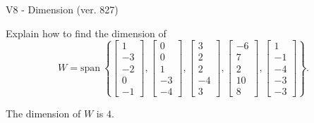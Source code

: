 \begin{exercise}
  \begin{exerciseTitle}V8 - Dimension (ver. 827)\end{exerciseTitle}
  \begin{exerciseStatement}
    Explain how to find the dimension of 
\[W=\mathrm{span}\ \left\{\left[\begin{array}{r}
1 \\
-3 \\
-2 \\
0 \\
-1
\end{array}\right] , \left[\begin{array}{r}
0 \\
0 \\
1 \\
-3 \\
-4
\end{array}\right] , \left[\begin{array}{r}
3 \\
2 \\
2 \\
-4 \\
3
\end{array}\right] , \left[\begin{array}{r}
-6 \\
7 \\
2 \\
10 \\
8
\end{array}\right] , \left[\begin{array}{r}
1 \\
-1 \\
-4 \\
-3 \\
-3
\end{array}\right]\right\}.\]



  \end{exerciseStatement}
  \begin{exerciseAnswer}
   The dimension of \(W\) is  \(4\).
  


  \end{exerciseAnswer}
\end{exercise}